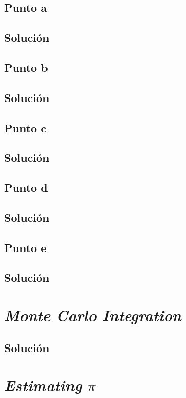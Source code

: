 \documentclass[12pt]{article}
\begin{document}
\subsection{Punto a}
\subsection{Solución}

\subsection{Punto b}
\subsection{Solución}

\subsection{Punto c}
\subsection{Solución}

\subsection{Punto d}
\subsection{Solución}

\subsection{Punto e}
\subsection{Solución}


\section{\textit{Monte Carlo Integration}}
\subsection{Solución}

\section{\textit{Estimating} \(\pi\)}
\end{document}
